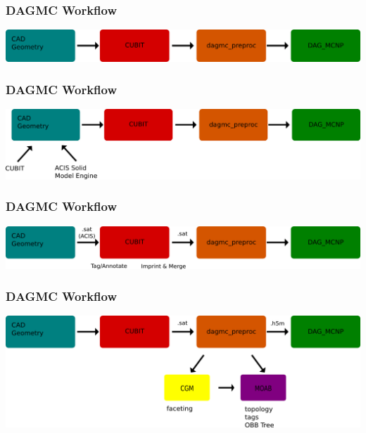 \documentclass[14pt]{beamer}
\begin{document}
\begin{frame}
\frametitle{DAGMC Workflow}
\includegraphics[scale=0.28, trim = 20 0 0 0 ]{DAGMC_Wrkflw1.png}
\end{frame}


\begin{frame}
\frametitle{DAGMC Workflow}
\includegraphics[scale=0.28, trim = 20 0 0 0 ]{DAGMC_Wrkflw2.png}
\end{frame}

\begin{frame}
\frametitle{DAGMC Workflow}
\includegraphics[scale=0.28, trim = 20 0 0 0 ]{DAGMC_Wrkflw3.png}
\end{frame}

\begin{frame}
\frametitle{DAGMC Workflow}
\includegraphics[scale=0.28, trim = 20 0 0 0 ]{DAGMC_Wrkflw4.png}
\end{frame}
\end{document}
